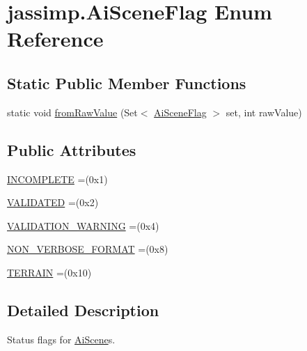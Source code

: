 \hypertarget{enumjassimp_1_1_ai_scene_flag}{\section{jassimp.\+Ai\+Scene\+Flag Enum Reference}
\label{enumjassimp_1_1_ai_scene_flag}
}
\subsection*{Static Public Member Functions}
\begin{DoxyCompactItemize}
\item 
static void \hyperlink{enumjassimp_1_1_ai_scene_flag_ab5765530d9fccd1a709a24c0a975cb94}{from\+Raw\+Value} (Set$<$ \hyperlink{enumjassimp_1_1_ai_scene_flag}{Ai\+Scene\+Flag} $>$ set, int raw\+Value)
\end{DoxyCompactItemize}
\subsection*{Public Attributes}
\begin{DoxyCompactItemize}
\item 
\hyperlink{enumjassimp_1_1_ai_scene_flag_ac0f7b1e56872049acc78d38b4d3eb98a}{I\+N\+C\+O\+M\+P\+L\+E\+T\+E} =(0x1)
\item 
\hyperlink{enumjassimp_1_1_ai_scene_flag_ac5df27f62c7e110d8feee7a6b36356b9}{V\+A\+L\+I\+D\+A\+T\+E\+D} =(0x2)
\item 
\hyperlink{enumjassimp_1_1_ai_scene_flag_a3e8366e5b14aabcd7a7e85ce3ba22adc}{V\+A\+L\+I\+D\+A\+T\+I\+O\+N\+\_\+\+W\+A\+R\+N\+I\+N\+G} =(0x4)
\item 
\hyperlink{enumjassimp_1_1_ai_scene_flag_a122fd9086bf97b49ca1331e0fe115fad}{N\+O\+N\+\_\+\+V\+E\+R\+B\+O\+S\+E\+\_\+\+F\+O\+R\+M\+A\+T} =(0x8)
\item 
\hyperlink{enumjassimp_1_1_ai_scene_flag_af27d32494468c26b8f3857f7507ac401}{T\+E\+R\+R\+A\+I\+N} =(0x10)
\end{DoxyCompactItemize}


\subsection{Detailed Description}
Status flags for \hyperlink{classjassimp_1_1_ai_scene}{Ai\+Scene}s. 

